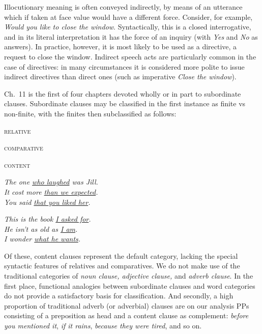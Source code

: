 Illocutionary meaning is often conveyed indirectly, by means of an utterance which if taken at face value would have a different force. Consider, for example, \textit{Would you like to close the window}. Syntactically, this is a closed interrogative, and in its literal interpretation it has the force of an inquiry (with \textit{Yes} and \textit{No} as answers). In practice, however, it is most likely to be used as a directive, a request to close the window. Indirect speech acts are particularly common in the case of directives: in many circumstances it is considered more polite to issue indirect directives than direct ones (such as imperative \textit{Close the window}).


Ch.~11 is the first of four chapters devoted wholly or in part to subordinate clauses. Subordinate clauses may be classified in the first instance as finite vs non-finite, with the finites then subclassified as follows:
\begin{examples}
\item \label{ex:34i}
\noindent\begin{minipage}[t]{0.25\linewidth}\vspace{-6pt}
    \begin{examples}
        \item\textsc{relative}
        \item\textsc{comparative}
        \item\textsc{content}
    \end{examples}
\end{minipage}
\begin{minipage}[t]{0.4\linewidth}
    \textit{The one \uline{who laughed} was Jill.}\\
    \textit{It cost more \uline{than we expected}.}\\
    \textit{You said \uline{that you liked her}.}
\end{minipage}
\noindent\begin{minipage}[t]{0.4\linewidth}
\textit{This is the book \uline{I asked for}.}\\
\textit{He isn't as old as \uline{I am}.}\\
\textit{I wonder \uline{what he wants}.}
\end{minipage}
\end{examples}
Of these, {content clauses} represent the default category, lacking the special syntactic features of relatives and comparatives. We do not make use of the traditional categories of \textit{noun clause, adjective clause,} and \textit{adverb clause}. In the first place, functional analogies between subordinate clauses and word categories do not provide a satisfactory basis for classification. And secondly, a high proportion of traditional adverb (or adverbial) clauses are on our analysis PPs consisting of a preposition as head and a content clause as complement: \textit{before you mentioned it}, \textit{if it rains}, \textit{because they were tired}, and so on.

